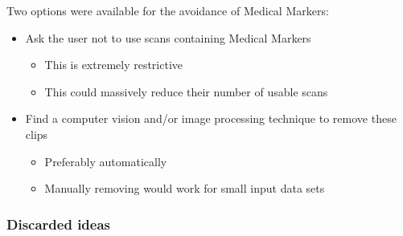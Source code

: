 Two options were available for the avoidance of Medical Markers:
\begin{itemize}
  \item Ask the user not to use scans containing Medical Markers
  \begin{itemize}
    \item This is extremely restrictive
    \item This could massively reduce their number of usable scans
  \end{itemize}
  \item Find a computer vision and/or image processing technique to remove these clips
  \begin{itemize}
    \item Preferably automatically
    \item Manually removing would work for small input data sets
  \end{itemize}
\end{itemize}

\subsubsection{Discarded ideas}

